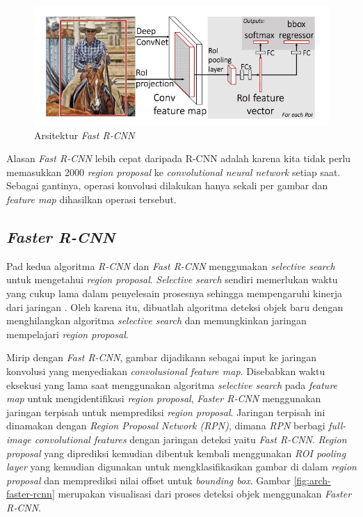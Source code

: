 \begin{figure}[h]
	\centering
	\includegraphics[scale=0.3]{gambar/fast-rcnn.png}
	\caption{Arsitektur \textit{Fast R-CNN} \citep{arch-fast-rcnn}}
	\label{fig:fast-rcnn}
\end{figure}

Alasan \textit{Fast R-CNN} lebih cepat daripada R-CNN adalah karena kita tidak perlu memasukkan 2000 \textit{region proposal} ke \textit{convolutional neural network} setiap saat. Sebagai gantinya, operasi konvolusi dilakukan hanya sekali per gambar dan \textit{feature map} dihasilkan operasi tersebut.

\subsection{\textit{Faster R-CNN}}
\label{subsec:faster-rcnn}

Pad kedua algoritma \textit{R-CNN} dan \textit{Fast R-CNN} menggunakan \textit{selective search} untuk mengetahui \textit{region proposal}. \textit{Selective search} sendiri memerlukan waktu yang cukup lama dalam penyelesain prosesnya sehingga mempengaruhi kinerja dari jaringan \citep{faster-rcnn}. Oleh karena itu, dibuatlah algoritma deteksi objek baru dengan menghilangkan algoritma \textit{selective search} dan memungkinkan jaringan mempelajari \textit{region proposal}.

Mirip dengan \textit{Fast R-CNN}, gambar dijadikann sebagai input ke jaringan konvolusi yang menyediakan \textit{convolusional feature map}. Disebabkan waktu eksekusi yang lama saat menggunakan algoritma \textit{selective search} pada \textit{feature map} untuk mengidentifikasi \textit{region proposal}, \textit{Faster R-CNN} menggunakan jaringan terpisah untuk memprediksi \textit{region proposal}. Jaringan terpisah ini dinamakan dengan \textit{Region Proposal Network (RPN)}, dimana \textit{RPN} berbagi \textit{full-image convolutional features} dengan jaringan deteksi yaitu \textit{Fast R-CNN}. \textit{Region proposal} yang diprediksi kemudian dibentuk kembali menggunakan \textit{ROI pooling layer} yang kemudian digunakan untuk mengklasifikasikan gambar di dalam \textit{region proposal} dan memprediksi nilai offset untuk \textit{bounding box}. Gambar \ref{fig:arch-faster-rcnn} merupakan visualisasi dari proses deteksi objek menggunakan \textit{Faster R-CNN}. 

